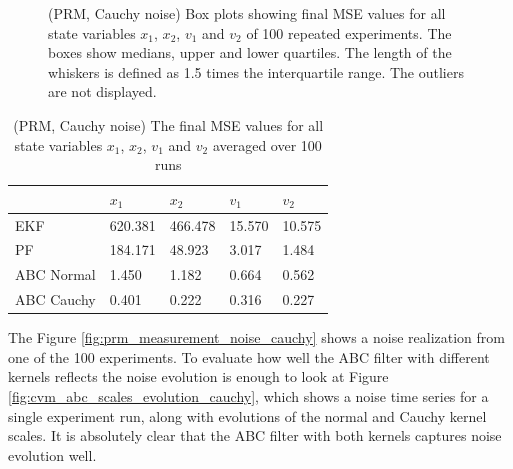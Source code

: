 \begin{figure}[!ht]
\centering
\caption{(PRM, Cauchy noise) Box plots showing final MSE values for all state variables $x_1$, $x_2$, $v_1$ and $v_2$ of 100 repeated experiments. The boxes show medians, upper and lower quartiles. The length of the whiskers is defined as 1.5 times the interquartile range. The outliers are not displayed.}
\label{fig:prm_mse_boxplot_cauchy}
\end{figure}

\begin{table}[h!]
\centering
\begin{tabular}{ |p{2cm}|p{2cm}|p{2cm}|p{2cm}|p{2cm}|}
 \hline 
  & $x_1$ & $x_2$ & $v_1$ & $v_2$ \\
 \hline \hline
 EKF & 620.381 & 466.478 & 15.570 & 10.575  \\
 PF & 184.171  & 48.923 & 3.017 & 1.484 \\
 ABC Normal & 1.450 & 1.182 & 0.664 & 0.562 \\
 ABC Cauchy & 0.401 & 0.222 & 0.316 & 0.227 \\
 \hline
\end{tabular}
\caption{(PRM, Cauchy noise) The final MSE values for all state variables $x_1$, $x_2$, $v_1$ and $v_2$ averaged over 100 runs}
\label{table:prm_mse_cauchy}
\end{table}

The Figure \ref{fig:prm_measurement_noise_cauchy} shows a noise realization from one of the 100 experiments. To evaluate how well the ABC filter with different kernels reflects the noise evolution is enough to look at Figure \ref{fig:cvm_abc_scales_evolution_cauchy}, which shows a noise time series for a single experiment run, along with evolutions of the normal and Cauchy kernel scales. It is absolutely clear that the ABC filter with both kernels captures noise evolution well.

